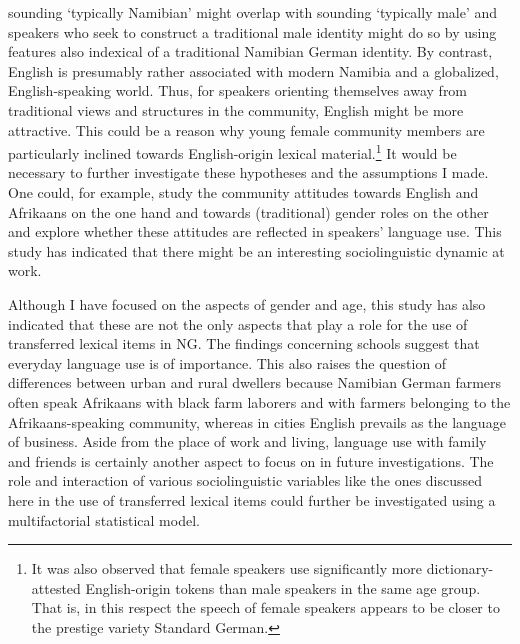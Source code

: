 \documentclass[output=paper]{langsci/langscibook}
\begin{document}
sounding ‘typically Namibian’ might overlap with sounding ‘typically male’ and speakers who seek to construct a traditional male identity might do so by using features also indexical of a traditional Namibian German identity. By contrast, English is presumably rather associated with modern Namibia and a globalized, English-speaking world. Thus, for speakers orienting themselves away from traditional views and structures in the community, English might be more attractive. This could be a reason why young female community members are particularly inclined towards English-origin lexical material.\footnote{It was also observed that female speakers use significantly more dictionary-attested English-origin tokens than male speakers in the same age group. That is, in this respect the speech of female speakers appears to be closer to the prestige variety Standard German.} It would be necessary to further investigate these hypotheses and the assumptions I made. One could, for example, study the community attitudes towards English and Afrikaans on the one hand and towards (traditional) gender roles on the other and explore whether these attitudes are reflected in speakers’ language use. This study has indicated that there might be an interesting sociolinguistic dynamic at work.

Although I have focused on the aspects of gender and age, this study has also indicated that these are not the only aspects that play a role for the use of transferred lexical items in NG. The findings concerning schools suggest that everyday language use is of importance. This also raises the question of differences between urban and rural dwellers because Namibian German farmers often speak Afrikaans with black farm laborers and with farmers belonging to the Afrikaans-speaking community, whereas in cities English prevails as the language of business. Aside from the place of work and living, language use with family and friends is certainly another aspect to focus on in future investigations. The role and interaction of various sociolinguistic variables like the ones discussed here in the use of transferred lexical items could further be investigated using a multifactorial statistical model.
\end{document}
